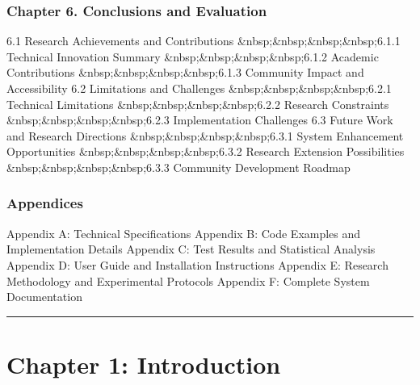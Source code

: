 \documentclass[11pt,a4paper]{report}
\begin{document}
\subsubsection{Chapter 6. Conclusions and Evaluation}

6.1 Research Achievements and Contributions
\&nbsp;\&nbsp;\&nbsp;\&nbsp;6.1.1 Technical Innovation Summary
\&nbsp;\&nbsp;\&nbsp;\&nbsp;6.1.2 Academic Contributions
\&nbsp;\&nbsp;\&nbsp;\&nbsp;6.1.3 Community Impact and Accessibility
6.2 Limitations and Challenges
\&nbsp;\&nbsp;\&nbsp;\&nbsp;6.2.1 Technical Limitations
\&nbsp;\&nbsp;\&nbsp;\&nbsp;6.2.2 Research Constraints
\&nbsp;\&nbsp;\&nbsp;\&nbsp;6.2.3 Implementation Challenges
6.3 Future Work and Research Directions
\&nbsp;\&nbsp;\&nbsp;\&nbsp;6.3.1 System Enhancement Opportunities
\&nbsp;\&nbsp;\&nbsp;\&nbsp;6.3.2 Research Extension Possibilities
\&nbsp;\&nbsp;\&nbsp;\&nbsp;6.3.3 Community Development Roadmap

\subsubsection{Appendices}

Appendix A: Technical Specifications
Appendix B: Code Examples and Implementation Details
Appendix C: Test Results and Statistical Analysis
Appendix D: User Guide and Installation Instructions
Appendix E: Research Methodology and Experimental Protocols
Appendix F: Complete System Documentation

\hrule

\section{Chapter 1: Introduction}
\end{document}
